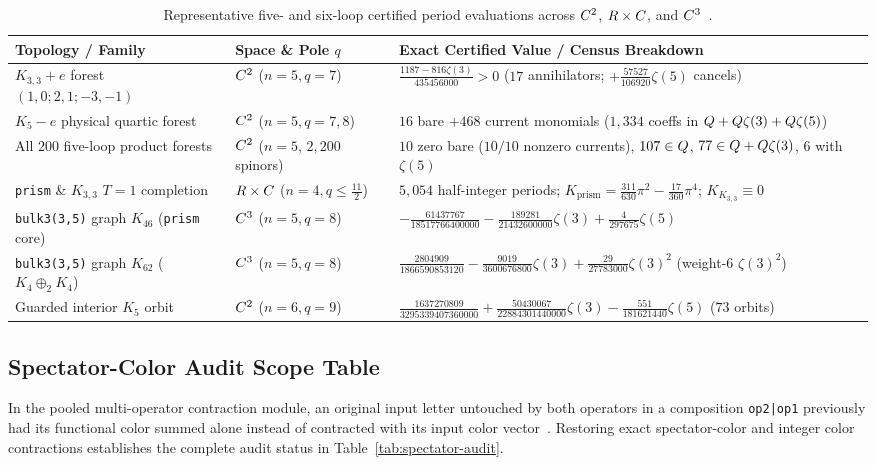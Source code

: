 \begin{table}[H]
\centering
\scriptsize
\setlength{\tabcolsep}{4pt}
\renewcommand{\arraystretch}{1.18}
\begin{tabularx}{\textwidth}{@{}ll>{\raggedright\arraybackslash}X@{}}
\toprule
\textbf{Topology / Family} & \textbf{Space \& Pole $q$} & \textbf{Exact Certified Value / Census Breakdown} \\
\midrule
$K_{3,3}+e$ forest $(1,0;2,1;-3,-1)$ & $C^2$ ($n=5, q=7$) & $\frac{1187 - 816\zeta(3)}{435456000} > 0$ ($17$ annihilators; $+\frac{57527}{106920}\zeta(5)$ cancels) \\
$K_5-e$ physical quartic forest & $C^2$ ($n=5, q=7,8$) & $16$ bare $+ 468$ current monomials ($1{,}334$ coeffs in $Q+Q\zeta(3)+Q\zeta(5)$) \\
All $200$ five-loop product forests & $C^2$ ($n=5$, $2{,}200$ spinors) & $10$ zero bare ($10/10$ nonzero currents), $107\in Q$, $77\in Q+Q\zeta(3)$, $6$ with $\zeta(5)$ \\
\texttt{prism} \& $K_{3,3}$ $T=1$ completion & $R\times C$ ($n=4, q\le\frac{11}{2}$) & $5{,}054$ half-integer periods; $K_{\mathrm{prism}}=\frac{311}{630}\pi^2-\frac{17}{360}\pi^4$; $K_{K_{3,3}}\equiv 0$ \\
\texttt{bulk3(3,5)} graph $K_{46}$ (\texttt{prism} core) & $C^3$ ($n=5, q=8$) & $-\frac{61437767}{18517766400000} - \frac{189281}{21432600000}\zeta(3) + \frac{4}{297675}\zeta(5)$ \\
\texttt{bulk3(3,5)} graph $K_{62}$ ($K_4\oplus_2 K_4$) & $C^3$ ($n=5, q=8$) & $\frac{2804909}{1866590853120} - \frac{9019}{3600676800}\zeta(3) + \frac{29}{27783000}\zeta(3)^2$ (weight-$6$ $\zeta(3)^2$) \\
Guarded interior $K_5$ orbit & $C^2$ ($n=6, q=9$) & $\frac{1637270809}{3295339407360000} + \frac{50430067}{22884301440000}\zeta(3) - \frac{551}{181621440}\zeta(5)$ ($73$ orbits) \\
\bottomrule
\end{tabularx}
\caption{Representative five- and six-loop certified period evaluations across $C^2$, $R\times C$, and $C^3$~\cite{Repo9e833c8}.}
\label{tab:app-fiveloop-ledger}
\end{table}

\subsection{Spectator-Color Audit Scope Table}
\label{subsec:app-spectator-audit}

In the pooled multi-operator contraction module, an original input letter untouched by both operators in a composition \texttt{op2|op1} previously had its functional color summed alone instead of contracted with its input color vector~\cite{Repo9e833c8}. Restoring exact spectator-color and integer color contractions establishes the complete audit status in Table~\ref{tab:spectator-audit}.

